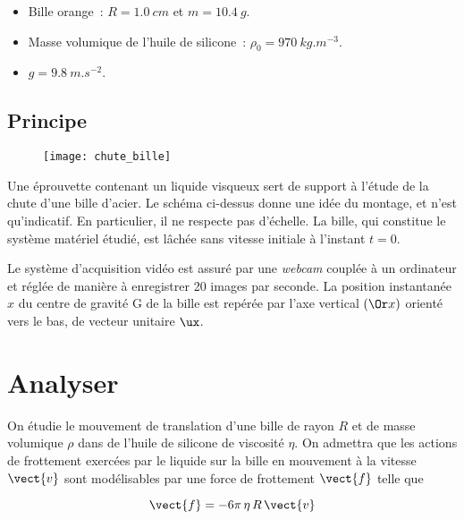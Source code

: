 \documentclass[a4paper, 11pt, final, garamond]{book}
\begin{document}
\begin{itemize}
    \item Bille orange~: $R = \SI{1,0}{cm}$ et $m = \SI{10,4}{g}$.
    \item Masse volumique de l'huile de silicone~: $\rho_0 =
        \SI{970}{kg.m^{-3}}$.
    \item $g = \SI{9,8}{m.s^{-2}}$.
\end{itemize}
 
\subsection{Principe}

\begin{wrapfigure}{r}{0.25\textwidth} 
    \vspace{-210pt}
    \begin{center}
        \texttt{[image: chute\_bille]}
    \end{center}
    \vspace{-30pt}
\end{wrapfigure} 

Une éprouvette contenant un liquide visqueux sert de support à l'étude de la
chute d'une bille d'acier. Le schéma ci-dessus donne une idée du montage, et
n'est qu'indicatif. En particulier, il ne respecte pas d'échelle. La bille, qui
constitue le système matériel étudié, est lâchée sans vitesse initiale à
l'instant $t = 0$. 

\bigbreak

Le système d'acquisition vidéo est assuré par une \textit{webcam} couplée à un
ordinateur et réglée de manière à enregistrer 20 images par seconde. La position
instantanée $x$ du centre de gravité G de la bille est repérée par l'axe
vertical $(\Or x)$ orienté vers le bas, de vecteur unitaire $\ux$.
 
\section{Analyser}

On étudie le mouvement de translation d'une bille de rayon $R$ et  de masse
volumique $\rho$ dans de l'huile de silicone de viscosité $\eta$. On admettra
que les actions de frottement exercées par le liquide sur la bille en mouvement
à la vitesse $\vect{v}$ sont modélisables par une force de frottement
$\vect{f}$ telle que 

\[
    \vect{f} = -6\pi \,\eta \, R \, \vect{v}
\]
\end{document}

